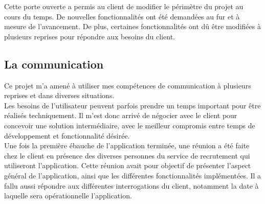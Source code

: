 Cette porte ouverte a permis au client de modifier le périmètre du projet au cours du temps.
De nouvelles fonctionnalités ont été demandées au fur et à mesure de l'avancement.
De plus, certaines fonctionnalités ont dû être modifiées à plusieurs reprises pour répondre aux besoins du client.


\subsection{La communication}

Ce projet m'a amené à utiliser mes compétences de communication à plusieurs reprises et dans diverses situations.
\\

Les besoins de l'utilisateur peuvent parfois prendre un temps important pour être réalisés techniquement.
Il m'est donc arrivé de négocier avec le client pour concevoir une solution intermédiaire, avec le meilleur compromis entre temps de développement et fonctionnalité désirée.
\\

Une fois la première ébauche de l'application terminée, une réunion a été faite chez le client en présence des diverses personnes du service de recrutement qui utiliseront l'application.
Cette réunion avait pour objectif de présenter l'aspect général de l'application, ainsi que les différentes fonctionnalités implémentées.
Il a fallu aussi répondre aux différentes interrogations du client, notamment la date à laquelle sera opérationnelle l'application.
